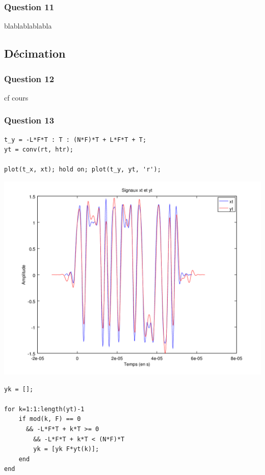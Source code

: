 \documentclass{acm_proc_article-sp}
\begin{document}
\begin{center}
\begin{center}
\subsubsection{Question 11}

blablablablabla

\subsection{Décimation}

\subsubsection{Question 12}

cf cours

\subsubsection{Question 13}

\begin{center}
\begin{lstlisting}
t_y = -L*F*T : T : (N*F)*T + L*F*T + T;
yt = conv(rt, htr);

plot(t_x, xt); hold on; plot(t_y, yt, 'r');
\end{lstlisting}

\includegraphics[scale=0.45]{yt_13.png}

\begin{lstlisting}
yk = [];

for k=1:1:length(yt)-1
    if mod(k, F) == 0 
      && -L*F*T + k*T >= 0 
        && -L*F*T + k*T < (N*F)*T
        yk = [yk F*yt(k)];
    end
end


\end{lstlisting}
\end{center}
\end{center}
\end{center}
\end{document}
